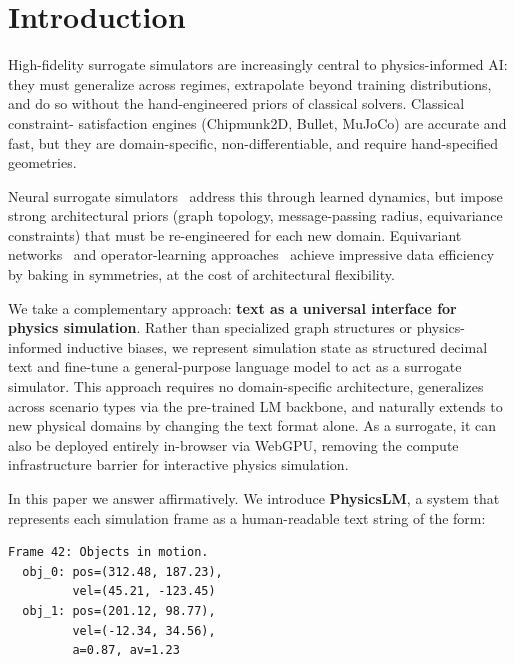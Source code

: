 \documentclass{article}
\begin{document}
\section{Introduction}
\label{sec:intro}

High-fidelity surrogate simulators are increasingly central to physics-informed AI:
they must generalize across regimes, extrapolate beyond training distributions, and
do so without the hand-engineered priors of classical solvers. Classical constraint-
satisfaction engines (Chipmunk2D, Bullet, MuJoCo) are accurate and fast, but they
are domain-specific, non-differentiable, and require hand-specified geometries.

Neural surrogate simulators~\citep{battaglia2016interaction, sanchez2020learning,
li2019learning, pfaff2021learning} address this through learned dynamics, but impose
strong architectural priors (graph topology, message-passing radius, equivariance
constraints) that must be re-engineered for each new domain. Equivariant
networks~\citep{satorras2021n} and operator-learning approaches~\citep{li2021fourier}
achieve impressive data efficiency by baking in symmetries, at the cost of
architectural flexibility.

We take a complementary approach: \textbf{text as a universal interface for physics
simulation}. Rather than specialized graph structures or physics-informed inductive
biases, we represent simulation state as structured decimal text and fine-tune a
general-purpose language model to act as a surrogate simulator. This approach requires
no domain-specific architecture, generalizes across scenario types via the pre-trained
LM backbone, and naturally extends to new physical domains by changing the text format
alone. As a surrogate, it can also be deployed entirely in-browser via WebGPU, removing
the compute infrastructure barrier for interactive physics simulation.

In this paper we answer affirmatively. We introduce \textbf{PhysicsLM}, a system
that represents each simulation frame as a human-readable text string of the
form:

\begin{small}
\begin{verbatim}
Frame 42: Objects in motion.
  obj_0: pos=(312.48, 187.23),
         vel=(45.21, -123.45)
  obj_1: pos=(201.12, 98.77),
         vel=(-12.34, 34.56),
         a=0.87, av=1.23
\end{verbatim}
\end{small}
\end{document}
